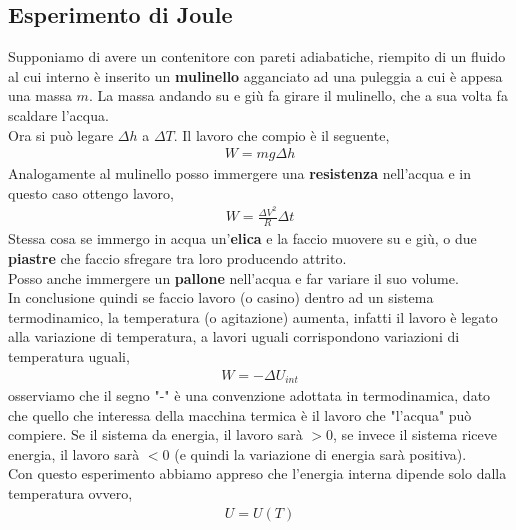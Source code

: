     \subsection{Esperimento di Joule}
        Supponiamo di avere un contenitore con pareti adiabatiche, riempito di un fluido al cui interno è inserito un \textbf{mulinello} agganciato ad una puleggia a cui è appesa una massa $m$. La massa andando su e giù fa girare il mulinello, che a sua volta fa scaldare l'acqua.\\
        Ora si può legare $\Delta h$ a $\Delta T$. Il lavoro che compio è il seguente,
        \begin{align*}
            W=mg\Delta h
        \end{align*}
        Analogamente al mulinello posso immergere una \textbf{resistenza} nell'acqua e in questo caso ottengo lavoro,
        \begin{align*}
            W=\frac{\Delta V^2}{R}\Delta t
        \end{align*}
        Stessa cosa se immergo in acqua un'\textbf{elica} e la faccio muovere su e giù, o due \textbf{piastre} che faccio sfregare tra loro producendo attrito.\\
        Posso anche immergere un \textbf{pallone} nell'acqua e far variare il suo volume.\\
        In conclusione quindi se faccio lavoro (o casino) dentro ad un sistema termodinamico, la temperatura (o agitazione) aumenta, infatti il lavoro è legato alla variazione di temperatura, a lavori uguali corrispondono variazioni di temperatura uguali,
        \begin{align*}
            W=-\Delta U_{int}
        \end{align*}
        osserviamo che il segno "-" è una convenzione adottata in termodinamica, dato che quello che interessa della macchina termica è il lavoro che "l'acqua" può compiere. Se il sistema da energia, il lavoro sarà $>0$, se invece il sistema riceve energia, il lavoro sarà $<0$ (e quindi la variazione di energia sarà positiva).\\
        Con questo esperimento abbiamo appreso che l'energia interna dipende solo dalla temperatura ovvero,
        \begin{align*}
            U = U(T)
        \end{align*}
